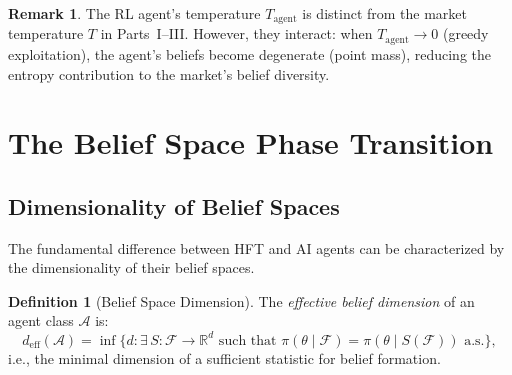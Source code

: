 \documentclass[12pt,a4paper]{article}
\theoremstyle{definition}
\newtheorem{definition}[theorem]{Definition}
\newtheorem{remark}[theorem]{Remark}
\newcommand{\R}{\mathbb{R}}
\newcommand{\F}{\mathcal{F}}
\begin{document}
\begin{remark}
The RL agent's temperature $T_{\mathrm{agent}}$ is distinct from the market temperature $T$ in Parts~I--III. However, they interact: when $T_{\mathrm{agent}} \to 0$ (greedy exploitation), the agent's beliefs become degenerate (point mass), reducing the entropy contribution to the market's belief diversity.
\end{remark}

\section{The Belief Space Phase Transition}\label{sec:phase-transition}

\subsection{Dimensionality of Belief Spaces}

The fundamental difference between HFT and AI agents can be characterized by the dimensionality of their belief spaces.

\begin{definition}[Belief Space Dimension]\label{def:belief-dim}
The \emph{effective belief dimension} of an agent class $\mathcal{A}$ is:
\begin{equation}
  d_{\mathrm{eff}}(\mathcal{A}) = \inf\{d : \exists\, S: \F \to \R^d \text{ such that } \pi(\theta \mid \F) = \pi(\theta \mid S(\F)) \text{ a.s.}\},
\end{equation}
i.e., the minimal dimension of a sufficient statistic for belief formation.
\end{definition}
\end{document}
